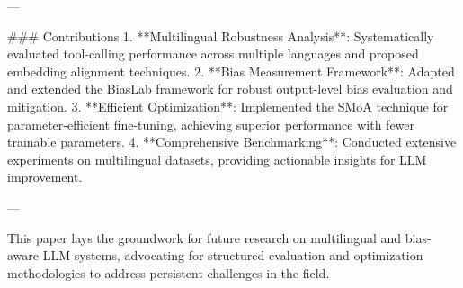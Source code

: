 ---

### Contributions
1. **Multilingual Robustness Analysis**: Systematically evaluated tool-calling performance across multiple languages and proposed embedding alignment techniques.
2. **Bias Measurement Framework**: Adapted and extended the BiasLab framework for robust output-level bias evaluation and mitigation.
3. **Efficient Optimization**: Implemented the SMoA technique for parameter-efficient fine-tuning, achieving superior performance with fewer trainable parameters.
4. **Comprehensive Benchmarking**: Conducted extensive experiments on multilingual datasets, providing actionable insights for LLM improvement.

--- 

This paper lays the groundwork for future research on multilingual and bias-aware LLM systems, advocating for structured evaluation and optimization methodologies to address persistent challenges in the field.